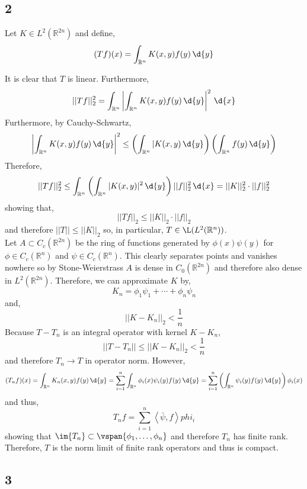 \documentclass[12pt]{article}
\newcommand{\inner}[2]{\left< #1, #2 \right>}
\newcommand{\R}{\mathbb{R}}
\begin{document}
\subsection{2}

\begin{exercise}
Let $K \in L^2(\R^{2n})$ and define,
\[ (T f)(x) = \int_{\R^n} K(x, y) f(y) \, \d{y} \]
\end{exercise}

It is clear that $T$ is linear. Furthermore,
\begin{align*}
|| T f ||_2^2 = \int_{\R^n} \left| \int_{\R^n} K(x,y) f(y) \, \d{y} \right|^2 \, \d{x} 
\end{align*}
Furthermore, by Cauchy-Schwartz,
\[ \left| \int_{\R^n} K(x,y) f(y) \, \d{y} \right|^2 \le \left( \int_{\R^n} |K(x,y) \, \d{y} \right) \left( \int_{\R^n} f(y) \, \d{y} \right) \]
Therefore,
\[ || T f ||_2^2 \le \int_{\R^n} \left( \int_{\R^n} |K(x,y)|^2 \, \d{y} \right) || f ||_2^2 \, \d{x} = || K ||^2_2 \cdot || f ||^2_2 \]
showing that,
\[ || T f ||_2 \le || K ||_2 \cdot || f ||_2 \]
and therefore $|| T || \le || K ||_2$ so, in particular, $T \in \L(L^2(\R^{n}))$.
\bigskip\\
Let $A \subset C_c(\R^{2n})$ be the ring of functions generated by $\phi(x) \psi(y)$ for $\phi \in C_c(\R^n)$ and $\psi \in C_c(\R^n)$. This clearly separates points and vanishes nowhere so by Stone-Weierstrass $A$ is dense in $C_0(\R^{2n})$ and therefore also dense in $L^2(\R^{2n})$. Therefore, we can approximate $K$ by,
\[ K_n = \phi_1 \psi_1 + \cdots + \phi_n \psi_n \]
and,
\[ || K - K_n ||_2 < \frac{1}{n} \] 
Because $T - T_n$ is an integral operator with kernel $K - K_n$,
\[ || T - T_n || \le || K - K_n ||_2 < \frac{1}{n} \]
and therefore $T_n \to T$ in operator norm. However,
\[ (T_n f)(x) = \int_{\R^n} K_n(x, y) f(y) \, \d{y} = \sum_{i = 1}^n \int_{\R^n} \phi_i(x) \psi_i(y) f(y) \, \d{y} = \sum_{i = 1}^n \left( \int_{\R^n} \psi_i(y) f(y) \, \d{y} \right) \phi_i(x) \] 
and thus,
\[ T_n f = \sum_{i = 1}^n \inner{\bar{\psi}}{f} phi_i \]
showing that $\im{T_n} \subset \vspan{\phi_1, \dots, \phi_n}$ and therefore $T_n$ has finite rank. Therefore, $T$ is the norm limit of finite rank operators and thus is compact.

\subsection{3}
\end{document}

